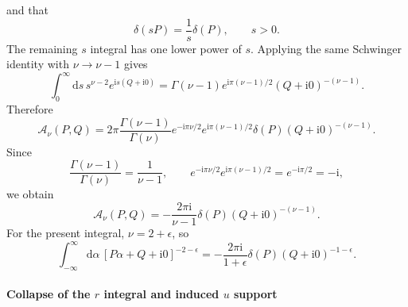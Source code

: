 \documentclass[11pt]{article}
\newcommand{\dd}{\mathrm d}
\newcommand{\ii}{\mathrm i}
\newcommand{\eps}{\epsilon}
\begin{document}
and that
\begin{equation}
\delta(sP)=\frac{1}{s}\delta(P),
\qquad s>0.
\end{equation}
The remaining $s$ integral has one lower power of $s$.  Applying the same Schwinger identity with $\nu\to\nu-1$ gives
\begin{equation}
\int_0^\infty \dd s\,
 s^{\nu-2}e^{\ii s(Q+\ii0)}
=
\Gamma(\nu-1)e^{\ii\pi(\nu-1)/2}(Q+\ii0)^{-(\nu-1)}.
\end{equation}
Therefore
\begin{equation}
\mathcal A_\nu(P,Q)
=
2\pi
\frac{\Gamma(\nu-1)}{\Gamma(\nu)}
 e^{-\ii\pi\nu/2}e^{\ii\pi(\nu-1)/2}
\delta(P)(Q+\ii0)^{-(\nu-1)}.
\end{equation}
Since
\begin{equation}
\frac{\Gamma(\nu-1)}{\Gamma(\nu)}=\frac{1}{\nu-1},
\qquad
 e^{-\ii\pi\nu/2}e^{\ii\pi(\nu-1)/2}=e^{-\ii\pi/2}=-\ii,
\end{equation}
we obtain
\begin{equation}
\boxed{
\mathcal A_\nu(P,Q)
=
-\frac{2\pi\ii}{\nu-1}
\delta(P)
(Q+\ii0)^{-(\nu-1)}.
}
\label{eq:A-nu-final}
\end{equation}
For the present integral, $\nu=2+\eps$, so
\begin{equation}
\boxed{
\int_{-\infty}^{\infty}\dd\alpha\,
[P\alpha+Q+\ii0]^{-2-\eps}
=
-\frac{2\pi\ii}{1+\eps}
\delta(P)
(Q+\ii0)^{-1-\eps}.
}
\label{eq:alpha-distribution-final}
\end{equation}



\paragraph{Collapse of the $r$ integral and induced $u$ support}
\end{document}
